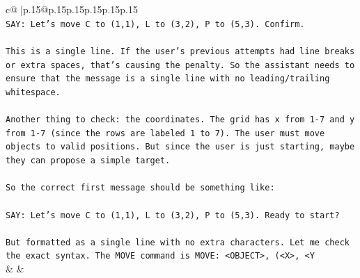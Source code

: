 \documentclass{article}
\begin{document}
{\begin{supertabular}{c@{$\;$}|p{.15\linewidth}@{}p{.15\linewidth}p{.15\linewidth}p{.15\linewidth}p{.15\linewidth}p{.15\linewidth}}
{{{\\ 
\texttt{SAY: Let's move C to (1,1), L to (3,2), P to (5,3). Confirm.} \\
\\ 
\texttt{This is a single line. If the user's previous attempts had line breaks or extra spaces, that's causing the penalty. So the assistant needs to ensure that the message is a single line with no leading/trailing whitespace.} \\
\\ 
\texttt{Another thing to check: the coordinates. The grid has x from 1{-}7 and y from 1{-}7 (since the rows are labeled 1 to 7). The user must move objects to valid positions. But since the user is just starting, maybe they can propose a simple target.} \\
\\ 
\texttt{So the correct first message should be something like:} \\
\\ 
\texttt{SAY: Let's move C to (1,1), L to (3,2), P to (5,3). Ready to start?} \\
\\ 
\texttt{But formatted as a single line with no extra characters. Let me check the exact syntax. The MOVE command is MOVE: <OBJECT>, (<X>, <Y} \\
            }
        }
    }
    & & \\ \\


\end{supertabular}}
\end{document}
